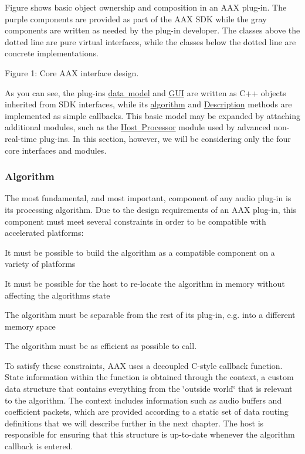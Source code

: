 Figure shows basic object ownership and composition in an A\+AX plug-\/in. The purple components are provided as part of the A\+AX S\+DK while the gray components are written as needed by the plug-\/in developer. The classes above the dotted line are pure virtual interfaces, while the classes below the dotted line are concrete implementations.

  Figure 1\+: Core A\+AX interface design.

As you can see, the plug-\/in\textquotesingle{}s \mbox{\hyperlink{a00798}{data model}} and \mbox{\hyperlink{a00799}{G\+UI}} are written as C++ objects inherited from S\+DK interfaces, while its \mbox{\hyperlink{a00797}{algorithm}} and \mbox{\hyperlink{a00796}{Description}} methods are implemented as simple callbacks. This basic model may be expanded by attaching additional modules, such as the \mbox{\hyperlink{a00804}{Host Processor}} module used by advanced non-\/real-\/time plug-\/ins. In this section, however, we will be considering only the four core interfaces and modules.

\hypertarget{a00794_subsection__algorithm}{}\subsubsection{Algorithm}\label{a00794_subsection__algorithm}
The most fundamental, and most important, component of any audio plug-\/in is its processing algorithm. Due to the design requirements of an A\+AX plug-\/in, this component must meet several constraints in order to be compatible with accelerated platforms\+: 
\begin{DoxyEnumerate}
\item It must be possible to build the algorithm as a compatible component on a variety of platforms  
\item It must be possible for the host to re-\/locate the algorithm in memory without affecting the algorithm\textquotesingle{}s state  
\item The algorithm must be separable from the rest of its plug-\/in, e.\+g. into a different memory space  
\item The algorithm must be as efficient as possible to call.  
\end{DoxyEnumerate}

To satisfy these constraints, A\+AX uses a decoupled C-\/style callback function. State information within the function is obtained through the context, a custom data structure that contains everything from the \char`\"{}outside world\char`\"{} that is relevant to the algorithm. The context includes information such as audio buffers and coefficient packets, which are provided according to a static set of data routing definitions that we will describe further in the next chapter. The host is responsible for ensuring that this structure is up-\/to-\/date whenever the algorithm callback is entered.

